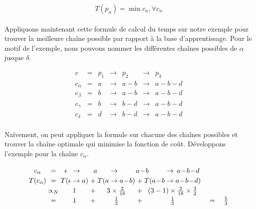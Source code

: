 \documentclass[12pt,french,twoside]{report}
\begin{document}
\begin{equation}
 T(p_n) = \min c_n, \forall c_n
\end{equation}


\paragraph{}Appliquons maintenant cette formule de calcul du temps sur notre exemple pour trouver la meilleure chaîne possible par
rapport à la base d'apprentissage. Pour le motif de l'exemple, nous pouvons nommer les différentes chaînes possibles de $\alpha$
jusque $\delta$.

\[
\begin{array}{ccccccc}
 c         & = & p_1 & \rightarrow & p_2     & \rightarrow & p_3 \\
 c_\alpha  & = & a   & \rightarrow & a\!-\!b & \rightarrow & a\!-\!b\!-\!d \\
 c_\beta   & = & b   & \rightarrow & a\!-\!b & \rightarrow & a\!-\!b\!-\!d \\
 c_\gamma  & = & b   & \rightarrow & b\!-\!d & \rightarrow & a\!-\!b\!-\!d \\
 c_\delta  & = & d   & \rightarrow & b\!-\!d & \rightarrow & a\!-\!b\!-\!d \\
\end{array}
\]

Naïvement, on peut appliquer la formule sur chacune des chaînes possibles et trouver la chaîne optimale qui minimise la fonction de
coût. Développons l'exemple pour la chaîne $c_{\alpha}$.

\[
\arraycolsep=1.4pt\def\arraystretch{1.2}
\begin{array}{cccccccccccccc}
  c_\alpha    & =  & \epsilon &  \rightarrow &  \multicolumn{3}{c}{a} & \rightarrow & \multicolumn{3}{c}{a\!-\!b} &  \rightarrow & \multicolumn{1}{c}{a\!-\!b\!-\!d} &\\
  T(c_\alpha)   & =  & T( \epsilon &  \rightarrow &  a)  & + & T( a &  \rightarrow  & a\!-\!b) & + & T(a\!-\!b &  \rightarrow & a\!-\!b\!-\!d) &\\
                    & \propto_{N}  &  \multicolumn{3}{c}{1} &  + & \multicolumn{3}{c}{3 \times \frac{2}{18}} & + & \multicolumn{3}{c}{  (3-1)\times \frac{2}{18} \times \frac{3}{2}} &\\
                    & = &  \multicolumn{3}{c}{1} &  + & \multicolumn{3}{c}{\frac{1}{3}} & + & \multicolumn{3}{c}{\frac{1}{3}}   & \quad= \quad\frac{5}{3} \\

\end{array}
\]
\end{document}
